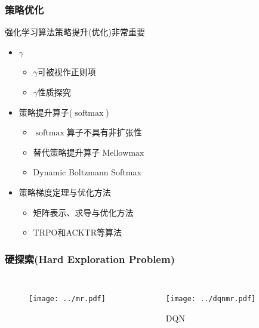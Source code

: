 \documentclass{beamer}
\begin{document}
\begin{CJK*}{GBK}{hei}
\begin{frame}\frametitle{策略优化}
强化学习算法策略提升(优化)非常重要
\begin{itemize}
\item $\gamma$
{
\begin{itemize}
    \item $\gamma$可被视作正则项\citep{Amit2020DiscountFA}
    \item $\gamma$性质探究\citep{Pitis2019RethinkingTD}
\end{itemize}
}
\item 策略提升算子($\operatorname{softmax}$)
{
\begin{itemize}
    \item $\operatorname{softmax}$算子不具有非扩张性\citep{Littman1996AGR}
    \item 替代策略提升算子$\operatorname{Mellowmax}$\citep{Asadi2017AnAS}
    \item Dynamic Boltzmann Softmax\citep{Pan2019ReinforcementLW}
\end{itemize}
}
\item 策略梯度定理与优化方法
{
\begin{itemize}
    \item 矩阵表示、求导与优化方法
    \item TRPO\citep{Schulman2015TrustRP}和ACKTR\citep{Wu2017ScalableTM}等算法
\end{itemize}
}
\end{itemize}
\end{frame}

\begin{frame}\frametitle{硬探索(Hard Exploration Problem)}

\begin{columns}
    \begin{figure}[htbp]
        \centering\texttt{[image: ../mr.pdf]}
    \end{figure}
    \begin{figure}[htbp]
        \centering\texttt{[image: ../dqnmr.pdf]}
        \caption{DQN\citep{Mnih2015HumanlevelCT}}
    \end{figure}
\end{columns}
\end{frame}


\end{CJK*}
\end{document}
